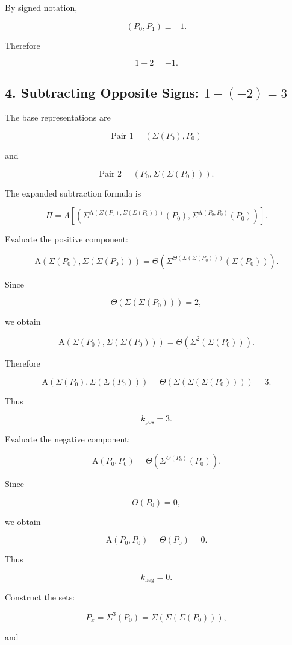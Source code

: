\documentclass[12pt]{article}
\newcommand{\Alpha}{\mathrm{A}}
\begin{document}
By signed notation,

\[
(P_0,P_1)\equiv-1.
\]

Therefore

\[
\boxed{
1-2=-1.
}
\]

\subsection*{4. Subtracting Opposite Signs: \(1-(-2)=3\)}

The base representations are

\[
\text{Pair 1}
=
(\Sigma(P_0),P_0)
\]

and

\[
\text{Pair 2}
=
(P_0,\Sigma(\Sigma(P_0))).
\]

The expanded subtraction formula is

\[
\Pi
=
\Lambda\left[
\left(
\Sigma^{\Alpha(\Sigma(P_0),\Sigma(\Sigma(P_0)))}(P_0),
\Sigma^{\Alpha(P_0,P_0)}(P_0)
\right)
\right].
\]

Evaluate the positive component:

\[
\Alpha(\Sigma(P_0),\Sigma(\Sigma(P_0)))
=
\Theta\left(
\Sigma^{\Theta(\Sigma(\Sigma(P_0)))}(\Sigma(P_0))
\right).
\]

Since

\[
\Theta(\Sigma(\Sigma(P_0)))=2,
\]

we obtain

\[
\Alpha(\Sigma(P_0),\Sigma(\Sigma(P_0)))
=
\Theta(\Sigma^2(\Sigma(P_0))).
\]

Therefore

\[
\Alpha(\Sigma(P_0),\Sigma(\Sigma(P_0)))
=
\Theta(\Sigma(\Sigma(\Sigma(P_0))))
=
3.
\]

Thus

\[
k_{\mathrm{pos}}=3.
\]

Evaluate the negative component:

\[
\Alpha(P_0,P_0)
=
\Theta\left(
\Sigma^{\Theta(P_0)}(P_0)
\right).
\]

Since

\[
\Theta(P_0)=0,
\]

we obtain

\[
\Alpha(P_0,P_0)
=
\Theta(P_0)
=
0.
\]

Thus

\[
k_{\mathrm{neg}}=0.
\]

Construct the sets:

\[
P_x
=
\Sigma^3(P_0)
=
\Sigma(\Sigma(\Sigma(P_0))),
\]

and
\end{document}
